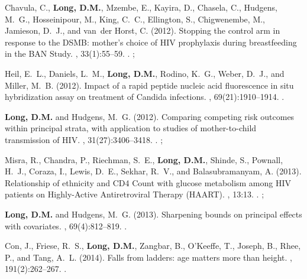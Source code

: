 \begin{thebibliography}{}

Chavula, C., \textbf{Long, D.M.}, Mzembe, E., Kayira, D., Chasela, C., Hudgens, M.~G.,
  Hosseinipour, M., King, C.~C., Ellington, S., Chigwenembe, M., Jamieson,
  D.~J., and van~der Horst, C. (2012).
\newblock Stopping the control arm in response to the {DSMB}: mother's choice
  of {HIV} prophylaxis during breastfeeding in the {BAN} {Study}.
, 33(1):55--59.
\newblock {}.
\newblock {}; 

Heil, E.~L., Daniels, L.~M., \textbf{Long, D.M.}, Rodino, K.~G., Weber, D.~J., and
  Miller, M.~B. (2012).
\newblock Impact of a rapid peptide nucleic acid fluorescence in situ
  hybridization assay on treatment of {Candida} infections.
,
  69(21):1910--1914.
\newblock {}.
\newblock {}

\textbf{Long, D.M.} and Hudgens, M.~G. (2012).
\newblock Comparing competing risk outcomes within principal strata, with
  application to studies of mother-to-child transmission of {HIV}.
, 31(27):3406--3418.
\newblock {}. \newblock {}; 

Misra, R., Chandra, P., Riechman, S.~E., \textbf{Long, D.M.}, Shinde, S., Pownall,
  H.~J., Coraza, I., Lewis, D.~E., Sekhar, R.~V., and Balasubramanyam, A.
  (2013).
\newblock Relationship of ethnicity and {CD4} {Count} with glucose metabolism
  among {HIV} patients on {Highly}-{Active} {Antiretroviral} {Therapy}
  ({HAART}).
, 13:13.
\newblock {}. \newblock {}; 

\textbf{Long, D.M.} and Hudgens, M.~G. (2013).
\newblock Sharpening bounds on principal effects with covariates.
, 69(4):812--819.
.  

Con, J., Friese, R.~S., \textbf{Long, D.M.}, Zangbar, B., O'Keeffe, T., Joseph, B.,
  Rhee, P., and Tang, A.~L. (2014).
\newblock Falls from ladders: age matters more than height.
, 191(2):262--267.
.  


\end{thebibliography}
